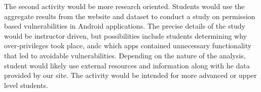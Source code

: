 The second activity would be more research oriented. Students would use the aggregate results from the website and dataset to conduct a study on permission based vulnerabilities in Android applications. The precise details of the study would be instructor driven, but possibilities include students determining why over-privileges took place, andc which apps contained unnecessary functionality that led to avoidable vulnerabilities. Depending on the nature of the analysis, student would likely use external resources and information along with he data provided by our site. The activity would be intended for more advanced or upper level students. 



























%



